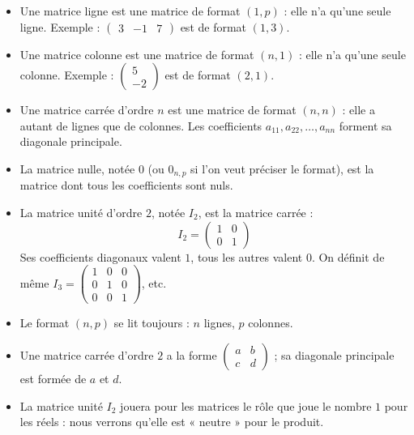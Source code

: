 \documentclass[11pt]{article}
\newcommand{\cle}[1]{{\popxbold\color{popdark}#1}}
\begin{document}
\begin{definition}
\begin{itemize}
\item Une \cle{matrice ligne} est une matrice de format $(1,p)$ : elle n'a qu'une seule ligne. Exemple : $\begin{pmatrix} 3 & -1 & 7 \end{pmatrix}$ est de format $(1,3)$.
\item Une \cle{matrice colonne} est une matrice de format $(n,1)$ : elle n'a qu'une seule colonne. Exemple : $\begin{pmatrix} 5 \\ -2 \end{pmatrix}$ est de format $(2,1)$.
\item Une \cle{matrice carrée d'ordre $n$} est une matrice de format $(n,n)$ : elle a autant de lignes que de colonnes. Les coefficients $a_{11}, a_{22}, \ldots, a_{nn}$ forment sa \cle{diagonale principale}.
\item La \cle{matrice nulle}, notée $0$ (ou $0_{n,p}$ si l'on veut préciser le format), est la matrice dont tous les coefficients sont nuls.
\item La \cle{matrice unité d'ordre $2$}, notée $I_2$, est la matrice carrée :
\[
I_2 = \begin{pmatrix} 1 & 0 \\ 0 & 1 \end{pmatrix}
\]
Ses coefficients diagonaux valent $1$, tous les autres valent $0$. On définit de même $I_3 = \begin{pmatrix} 1 & 0 & 0 \\ 0 & 1 & 0 \\ 0 & 0 & 1 \end{pmatrix}$, etc.
\end{itemize}
\end{definition}

\begin{aretenir}[À retenir]
\begin{itemize}
\item Le format $(n,p)$ se lit toujours : $n$ lignes, $p$ colonnes.
\item Une matrice carrée d'ordre $2$ a la forme $\begin{pmatrix} a & b \\ c & d \end{pmatrix}$ ; sa diagonale principale est formée de $a$ et $d$.
\item La matrice unité $I_2$ jouera pour les matrices le rôle que joue le nombre $1$ pour les réels : nous verrons qu'elle est « neutre » pour le produit.
\end{itemize}
\end{aretenir}
\end{document}
